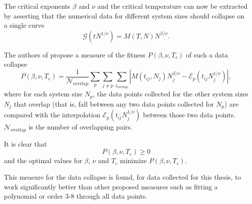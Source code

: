 The critical exponents $\beta$ and $\nu$ and the critical temperature can now be extracted by asserting that the
numerical data for different system sizes should collapse on a single curve
\begin{equation}
  \mathcal{G}(t N^{1/\nu}) = M(T, N) N^{\beta/\nu}.
\end{equation}

The authors of \cite{bhattacharjee2001measure} propose a measure of the fitness $P(\beta, \nu, T_c)$ of such a data collapse
\begin{equation}\label{eq:fitness_data_collapse}
  P(\beta, \nu, T_c) = \frac{1}{\mathcal{N}_{\text{overlap}}} \sum_p \sum_{j \neq p} \sum_{i_{\text{overlap}}}
    |  M(t_{i j}, N_j) N_{j}^{\beta/\nu} - \mathcal{E}_{p}(t_{i j} N_{j}^{1/\nu} ) |,
\end{equation}
where for each system size $N_p$, the data points collected for the other system sizes $N_j$ that overlap (that is,
fall between any two data points collected for $N_p$) are compared with the interpolation $\mathcal{E}_{p}(t_{i j}
N_{j}^{1/\nu})$ between those two data points. $\mathcal{N}_{\text{overlap}}$ is the number of overlapping pairs.

It is clear that
\begin{equation}
  P(\beta, \nu, T_c) \geq 0
\end{equation}
and the optimal values for $\beta$, $\nu$ and $T_c$ minimize $P(\beta, \nu, T_c)$.

This measure for the data collapse is found, for data collected for this thesis,
to work significantly better than other proposed measures such as fitting a polynomial or order 3-8 through all data
points.
